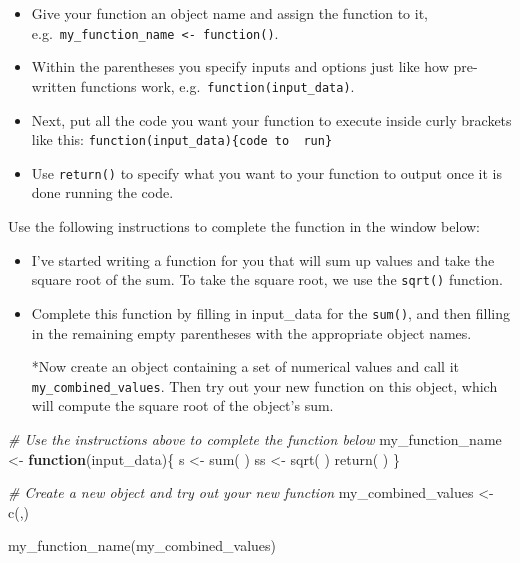 \documentclass[
]{book}
\newenvironment{Shaded}{\begin{snugshade}}{\end{snugshade}}
\newcommand{\CommentTok}[1]{\textcolor[rgb]{0.56,0.35,0.01}{\textit{#1}}}
\newcommand{\ControlFlowTok}[1]{\textcolor[rgb]{0.13,0.29,0.53}{\textbf{#1}}}
\newcommand{\FunctionTok}[1]{\textcolor[rgb]{0.00,0.00,0.00}{#1}}
\newcommand{\NormalTok}[1]{#1}
\newcommand{\OtherTok}[1]{\textcolor[rgb]{0.56,0.35,0.01}{#1}}
\begin{document}
\begin{itemize}
\item
  Give your function an object name and assign the function to it, e.g.~\texttt{my\_function\_name\ \textless{}-\ function()}.
\item
  Within the parentheses you specify inputs and options just like how pre-written functions work, e.g.~\texttt{function(input\_data)}.
\item
  Next, put all the code you want your function to execute inside curly brackets like this: \texttt{function(input\_data)\{code\ to\ \ run\}}
\item
  Use \texttt{return()} to specify what you want to your function to output once it is done running the code.
\end{itemize}

Use the following instructions to complete the function in the window below:

\begin{itemize}
\item
  I've started writing a function for you that will sum up values and take the square root of the sum. To take the square root, we use the \texttt{sqrt()} function.
\item
  Complete this function by filling in input\_data for the \texttt{sum()}, and then filling in the remaining empty parentheses with the appropriate object names.

  *Now create an object containing a set of numerical values and call it \texttt{my\_combined\_values}. Then try out your new function on this object, which will compute the square root of the object's sum.
\end{itemize}

\begin{Shaded}
\begin{Highlighting}[]
\CommentTok{\# Use the instructions above to complete the function below}
\NormalTok{my\_function\_name }\OtherTok{\textless{}{-}} \ControlFlowTok{function}\NormalTok{(input\_data)\{}
\NormalTok{  s }\OtherTok{\textless{}{-}} \FunctionTok{sum}\NormalTok{( )}
\NormalTok{  ss }\OtherTok{\textless{}{-}} \FunctionTok{sqrt}\NormalTok{( )}
  \FunctionTok{return}\NormalTok{( )}
\NormalTok{\}}

\CommentTok{\# Create a new object and try out your new function}
\NormalTok{my\_combined\_values }\OtherTok{\textless{}{-}} \FunctionTok{c}\NormalTok{(,) }

\FunctionTok{my\_function\_name}\NormalTok{(my\_combined\_values)}
\end{Highlighting}
\end{Shaded}
\end{document}
